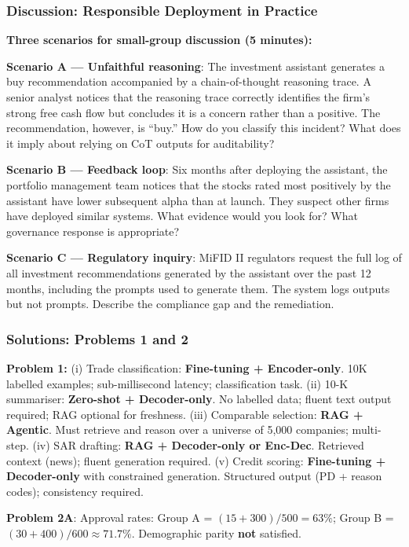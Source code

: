 \documentclass[9pt,t]{beamer}
\begin{document}
\begin{frame}
\frametitle{Discussion: Responsible Deployment in Practice}

\textbf{Three scenarios for small-group discussion (5 minutes):}

\medskip
\textbf{Scenario A — Unfaithful reasoning}: The investment assistant generates a buy recommendation accompanied by a chain-of-thought reasoning trace. A senior analyst notices that the reasoning trace correctly identifies the firm's strong free cash flow but concludes it is a concern rather than a positive. The recommendation, however, is ``buy.'' How do you classify this incident? What does it imply about relying on CoT outputs for auditability?

\medskip
\textbf{Scenario B — Feedback loop}: Six months after deploying the assistant, the portfolio management team notices that the stocks rated most positively by the assistant have lower subsequent alpha than at launch. They suspect other firms have deployed similar systems. What evidence would you look for? What governance response is appropriate?

\medskip
\textbf{Scenario C — Regulatory inquiry}: MiFID II regulators request the full log of all investment recommendations generated by the assistant over the past 12 months, including the prompts used to generate them. The system logs outputs but not prompts. Describe the compliance gap and the remediation.
\end{frame}

\begin{frame}
\frametitle{Solutions: Problems 1 and 2}

\textbf{Problem 1:}
(i) Trade classification: \textbf{Fine-tuning + Encoder-only}. 10K labelled examples; sub-millisecond latency; classification task. (ii) 10-K summariser: \textbf{Zero-shot + Decoder-only}. No labelled data; fluent text output required; RAG optional for freshness. (iii) Comparable selection: \textbf{RAG + Agentic}. Must retrieve and reason over a universe of 5,000 companies; multi-step. (iv) SAR drafting: \textbf{RAG + Decoder-only or Enc-Dec}. Retrieved context (news); fluent generation required. (v) Credit scoring: \textbf{Fine-tuning + Decoder-only} with constrained generation. Structured output (PD + reason codes); consistency required.

\medskip
\textbf{Problem 2A}: Approval rates: Group A = $(15+300)/500 = 63\%$; Group B = $(30+400)/600 \approx 71.7\%$. Demographic parity \textbf{not} satisfied.
\end{frame}
\end{document}
